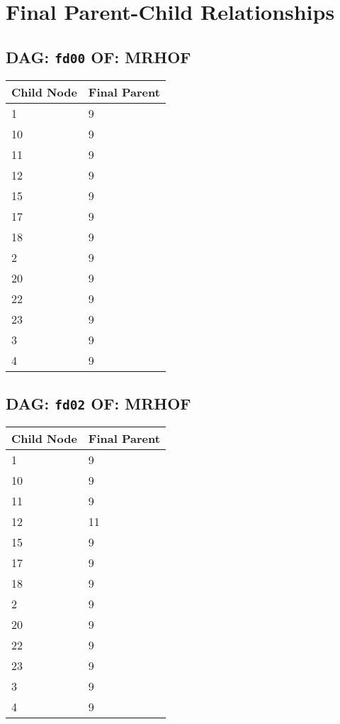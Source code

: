 \documentclass{article}
\begin{document}
\pagestyle{fancy}
\fancyhf{}
\section*{Final Parent-Child Relationships}
\subsection*{DAG: \texttt{fd00} OF: MRHOF}
\begin{tabular}{ll}
\toprule
\textbf{Child Node} & \textbf{Final Parent} \\
\midrule
1 & 9 \\
10 & 9 \\
11 & 9 \\
12 & 9 \\
15 & 9 \\
17 & 9 \\
18 & 9 \\
2 & 9 \\
20 & 9 \\
22 & 9 \\
23 & 9 \\
3 & 9 \\
4 & 9 \\
\bottomrule
\end{tabular}

\subsection*{DAG: \texttt{fd02} OF: MRHOF}
\begin{tabular}{ll}
\toprule
\textbf{Child Node} & \textbf{Final Parent} \\
\midrule
1 & 9 \\
10 & 9 \\
11 & 9 \\
12 & 11 \\
15 & 9 \\
17 & 9 \\
18 & 9 \\
2 & 9 \\
20 & 9 \\
22 & 9 \\
23 & 9 \\
3 & 9 \\
4 & 9 \\
\bottomrule
\end{tabular}
\end{document}

